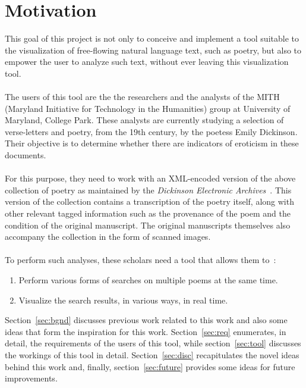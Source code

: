 \documentclass[10pt, twocolumn]{article}
\begin{document}
\section{Motivation}
This goal of this project is not only to conceive and implement a tool suitable to the visualization of  free-flowing natural language text, such as poetry, but also to empower the user to analyze such text, without ever leaving this visualization tool.  \\ \\
The users of this tool are the the researchers and the analysts of the MITH (Maryland Initiative for Technology in the Humanities) group at University of Maryland, College Park. These analysts are currently studying a selection of verse-letters and poetry, from the 19th  century,  by the poetess Emily Dickinson. Their objective is to determine whether there are indicators of eroticism in these documents.~\cite{lesbian} \\ \\
For this purpose, they need to work with an XML-encoded version of the above collection of poetry as maintained by the \textit{Dickinson Electronic Archives}~\cite{mith, mithweb}. This version of the collection contains a transcription of the poetry itself, along with other relevant tagged information such as the provenance of the poem and the condition of the original manuscript. The original manuscripts themselves also accompany the collection in the form of scanned images. \\ \\
To perform such analyses, these scholars need a tool that allows them to~:
\begin{enumerate}
\item Perform various forms of searches on multiple poems at the same time.
\item Visualize the search results, in various ways, in real time. 
\end{enumerate}
Section~\ref{sec:bgnd} discusses previous work related to this work and also some ideas that form the inspiration for this work. Section~\ref{sec:req} enumerates, in detail, the requirements of the users of this tool, while section~\ref{sec:tool} discusses the workings of this tool in detail. Section~\ref{sec:disc} recapitulates the novel ideas behind this work and, finally, section~\ref{sec:future} provides some ideas for future improvements. 
\end{document}
